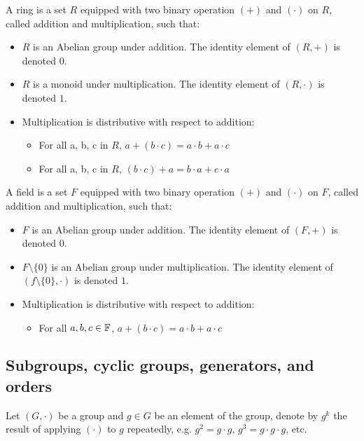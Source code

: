\begin{definition}[Ring]
A \textup{ring} is a set $R$ equipped with two binary operation $(+)$ and $(\cdot)$ on $R$, called \textup{addition} and \textup{multiplication}, such that:
\begin{itemize}
    \item $R$ is an \textup{Abelian group} under addition. The identity element of $(R, +)$ is denoted $0$.
    \item $R$ is a \textup{monoid} under multiplication. The identity element of $(R, \cdot)$ is denoted $1$.
    \item Multiplication is \textup{distributive} with respect to addition:
    \begin{itemize}
        \item For all a, b, c in $R$, $a + (b \cdot c) = a \cdot b + a \cdot c$
        \item For all a, b, c in $R$, $(b \cdot c) + a = b \cdot a + c \cdot a$
    \end{itemize}
\end{itemize}
\end{definition}

\begin{definition}[Field]
A \textup{field} is a set $F$ equipped with two binary operation $(+)$ and $(\cdot)$ on $F$, called \textup{addition} and \textup{multiplication}, such that:
\begin{itemize}
    \item $F$ is an \textup{Abelian group} under addition. The identity element of $(F, +)$ is denoted $0$.
    \item $F \setminus \{0\}$ is an \textup{Abelian group} under multiplication. The identity element of $(f \setminus \{0\}, \cdot)$ is denoted $1$.
    \item Multiplication is \textup{distributive} with respect to addition:
    \begin{itemize}
        \item For all $a, b, c \in \mathbb{F}$, $a + (b \cdot c) = a \cdot b + a \cdot c$
    \end{itemize}
\end{itemize}
\end{definition}

\subsection{Subgroups, cyclic groups, generators, and orders}

Let $(G, \cdot)$ be a group and $g \in G$ be an element of the group, denote by $g^k$ the result of applying $(\cdot)$ to $g$ repeatedly, e.g. $g^2 = g \cdot g$, $g^3 = g \cdot g \cdot g$, etc.

